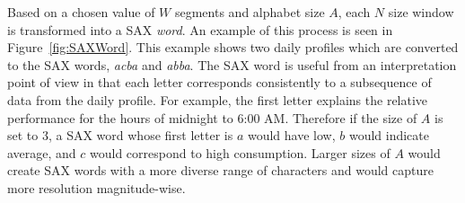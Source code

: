 Based on a chosen value of $W$ segments and alphabet size $A$, each $N$ size window is transformed into a SAX \emph{word}. An example of this process is seen in Figure~\ref{fig:SAXWord}. This example shows two daily profiles which are converted to the SAX words, \emph{acba} and \emph{abba}. The SAX word is useful from an interpretation point of view in that each letter corresponds consistently to a subsequence of data from the daily profile. For example, the first letter explains the relative performance for the hours of midnight to 6:00 AM. Therefore if the size of $A$ is set to 3, a SAX word whose first letter is $a$ would have low, $b$ would indicate average, and $c$ would correspond to high consumption. Larger sizes of $A$ would create SAX words with a more diverse range of characters and would capture more resolution magnitude-wise.